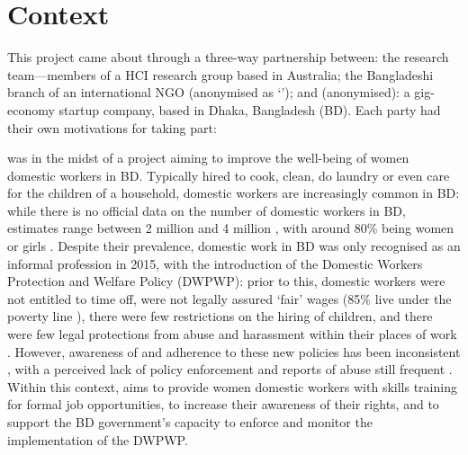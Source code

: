 \section{Context}

This project came about through a three-way partnership between: the research team---members of a HCI research group based in Australia; the Bangladeshi branch of an international NGO (anonymised as `\NGO{}'); and \PC{} (anonymised): a gig-economy startup company, based in Dhaka, Bangladesh (BD). Each party had their own motivations for taking part:

\NGO{} was in the midst of a project aiming to improve the well-being of women domestic workers in BD. Typically hired to cook, clean, do laundry or even care for the children of a household, domestic workers are increasingly common in BD: while there is no official data on the number of domestic workers in BD, estimates range between 2 million \cite{DWRN2011} and 4 million \cite{Ashraf2019}, with around 80\% being women or girls \cite{Ashraf2019}. Despite their prevalence, domestic work in BD was only recognised as an informal profession in 2015, with the introduction of the Domestic Workers Protection and Welfare Policy (DWPWP): prior to this, domestic workers were not entitled to time off, were not legally assured `fair' wages (85\% live under the poverty line \cite{BILS2015}), there were few restrictions on the hiring of children, and there were few legal protections from abuse and harassment within their places of work \cite{IDWF2015}. However, awareness of and adherence to these new policies has been inconsistent \cite{islam2016}, with a perceived lack of policy enforcement and reports of abuse still frequent \cite{DailyStar2018}. Within this context, \NGO{} aims to provide women domestic workers with skills training for formal job opportunities, to increase their awareness of their rights, and to support the BD government's capacity to enforce and monitor the implementation of the DWPWP. 

